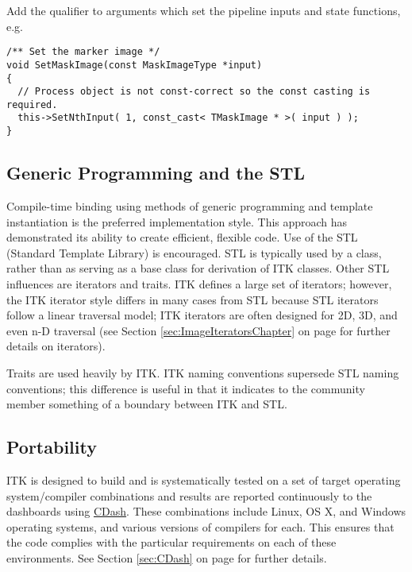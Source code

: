 Add the  qualifier to arguments which set the pipeline inputs and
state functions, e.g.
\small
\begin{verbatim}
/** Set the marker image */
void SetMaskImage(const MaskImageType *input)
{
  // Process object is not const-correct so the const casting is required.
  this->SetNthInput( 1, const_cast< TMaskImage * >( input ) );
}
\end{verbatim}
\normalsize


\subsection{Generic Programming and the STL}
\label{subsec:GenericProgrammingAndSTL}

Compile-time binding using methods of generic programming and template
instantiation is the preferred implementation style. This approach has
demonstrated its ability to create efficient, flexible code. Use of the STL
(Standard Template Library) is encouraged. STL is typically used by a class,
rather than as serving as a base class for derivation of ITK classes. Other
STL influences are iterators and traits. ITK defines a large set of iterators;
however, the ITK iterator style differs in many cases from STL because STL
iterators follow a linear traversal model; ITK iterators are often designed for
2D, 3D, and even n-D traversal (see Section \ref{sec:ImageIteratorsChapter} on
page \pageref{sec:ImageIteratorsChapter} for further details on iterators).

Traits are used heavily by ITK. ITK naming conventions supersede STL naming
conventions; this difference is useful in that it indicates to the community
member something of a boundary between ITK and STL.


\subsection{Portability}
\label{subsec:Portability}

ITK is designed to build and is systematically tested on a set of target
operating system/compiler combinations and results are reported continuously
to the dashboards using \href{https://www.cdash.org/}{CDash}. These combinations
include Linux, OS X, and Windows operating systems, and various versions of
compilers for each. This ensures that the code complies with the particular
requirements on each of these environments. See Section \ref{sec:CDash}
on page \pageref{sec:CDash} for further details.


